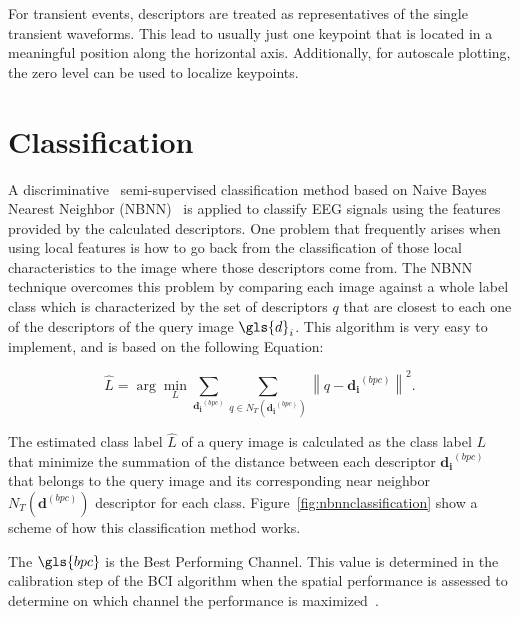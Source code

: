For transient events, descriptors are treated as representatives of the single transient waveforms.  This lead to usually just one keypoint that is located in a meaningful position along the horizontal axis.  Additionally, for autoscale plotting, the zero level can be used to localize keypoints.

\section{Classification}
\label{nbnn}

A discriminative~\cite{WolpawJonathanR2012} semi-supervised classification method based on Naive Bayes Nearest Neighbor (NBNN)~\cite{Boiman2008} is applied to classify EEG signals using the features provided by the calculated descriptors.
One problem that frequently arises when using local features is how to go back from the classification of those local characteristics to the image where those descriptors come from.
The NBNN technique overcomes this problem by comparing each image against a whole label class which is characterized by the set of descriptors $q$ that are closest to each one of the descriptors of the query image $\gls{d}_i$. This algorithm is very easy to implement, and is based on the following Equation:

\begin{equation}
\hat{L} = \arg \min_{L} \sum_{\mathbf{d_i}^{(bpc)}} \sum_{q \in N_T(\mathbf{d_i}^{(bpc)})}^{} {\left\lVert q -  \mathbf{d_i}^{(bpc)} \right\rVert}  ^{2} .
\label{eq:classification}
\end{equation}

The estimated class label $\hat{L}$ of a query image is calculated as the class label $L$ that minimize the summation of the distance between each descriptor $\mathbf{d_i}^{(bpc)}$ that belongs to the query image and its corresponding near neighbor $N_T(\mathbf{d}^{(bpc)})$  descriptor for each class. Figure~\ref{fig:nbnnclassification} show a scheme of how this classification method works.

The $\gls{bpc}$ is the Best Performing Channel.  This value is determined in the calibration step of the BCI algorithm when the spatial performance is assessed to determine on which channel the performance is maximized~\cite{Chavarriaga2017}.


